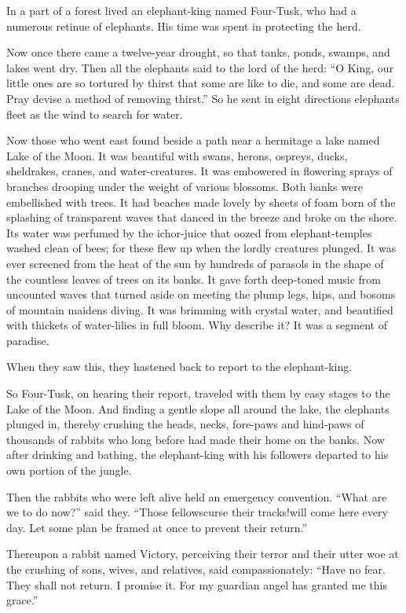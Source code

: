 \documentclass[article, twoside, 14pt]{memoir}
\begin{document}
\label{s49}

In a part of a forest lived an elephant-king named Four-Tusk, who
had a numerous retinue of elephants. His time was spent in
protecting the herd.

Now once there came a twelve-year drought, so that tanks, ponds,
swamps, and lakes went dry. Then all the elephants said to the lord
of the herd:
``O King, our little ones are so tortured by thirst that some are like to die, and some are dead. Pray devise a method of removing thirst.''
So he sent in eight directions elephants fleet as the wind to
search for water.

Now those who went east found beside a path near a hermitage a lake
named Lake of the Moon. It was beautiful with swans, herons,
ospreys, ducks, sheldrakes, cranes, and water-creatures. It was
embowered in flowering sprays of branches drooping under the weight
of various blossoms. Both banks were embellished with trees. It had
beaches made lovely by sheets of foam born of the splashing of
transparent waves that danced in the breeze and broke on the shore.
Its water was perfumed by the ichor-juice that oozed from
elephant-temples washed clean of bees; for these flew up when the
lordly creatures plunged. It was ever screened from the heat of the
sun by hundreds of parasols in the shape of the countless leaves of
trees on its banks. It gave forth deep-toned music from uncounted
waves that turned aside on meeting the plump legs, hips, and bosoms
of mountain maidens diving. It was brimming with crystal water, and
beautified with thickets of water-lilies in full bloom. Why
describe it? It was a segment of paradise.

When they saw this, they hastened back to report to the
elephant-king.

So Four-Tusk, on hearing their report, traveled with them by
easy stages to the Lake of the Moon. And finding a gentle slope all
around the lake, the elephants plunged in, thereby crushing the
heads, necks, fore-paws and hind-paws of thousands of rabbits who
long before had made their home on the banks. Now after drinking
and bathing, the elephant-king with his followers departed to his
own portion of the jungle.

Then the rabbits who were left alive held an emergency convention.
``What are we to do now?'' said they.
``Those fellows{\textemdash}curse their tracks!{\textemdash}will come here every day. Let some plan be framed at once to prevent their return.''

Thereupon a rabbit named Victory, perceiving their terror and their
utter woe at the crushing of sons, wives, and relatives, said
compassionately:
``Have no fear. They shall not return. I promise it. For my guardian angel has granted me this grace.''
\end{document}
